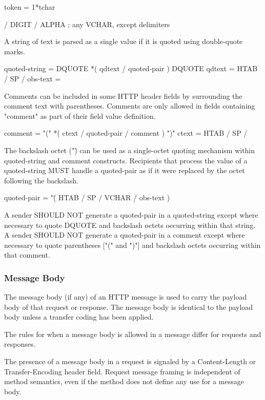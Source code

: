  token          = 1*tchar

                 / DIGIT / ALPHA
                 ; any VCHAR, except delimiters

A string of text is parsed as a single value if it is quoted using
double-quote marks.

  quoted-string  = DQUOTE *( qdtext / quoted-pair ) DQUOTE
  qdtext         = HTAB / SP /%
  obs-text       = %

Comments can be included in some HTTP header fields by surrounding
the comment text with parentheses.  Comments are only allowed in
fields containing "comment" as part of their field value definition.

  comment        = "(" *( ctext / quoted-pair / comment ) ")"
  ctext          = HTAB / SP / %

The backslash octet ("\") can be used as a single-octet quoting
mechanism within quoted-string and comment constructs.  Recipients
that process the value of a quoted-string MUST handle a quoted-pair
as if it were replaced by the octet following the backslash.

  quoted-pair    = "\" ( HTAB / SP / VCHAR / obs-text )

A sender SHOULD NOT generate a quoted-pair in a quoted-string except
where necessary to quote DQUOTE and backslash octets occurring within
that string.  A sender SHOULD NOT generate a quoted-pair in a comment
except where necessary to quote parentheses ["(" and ")"] and
backslash octets occurring within that comment.
\subsubsection{Message Body }
The message body (if any) of an HTTP message is used to carry the
payload body of that request or response.  The message body is
identical to the payload body unless a transfer coding has been
applied.


The rules for when a message body is allowed in a message differ for
requests and responses.

The presence of a message body in a request is signaled by a
Content-Length or Transfer-Encoding header field.  Request message
framing is independent of method semantics, even if the method does
not define any use for a message body.

